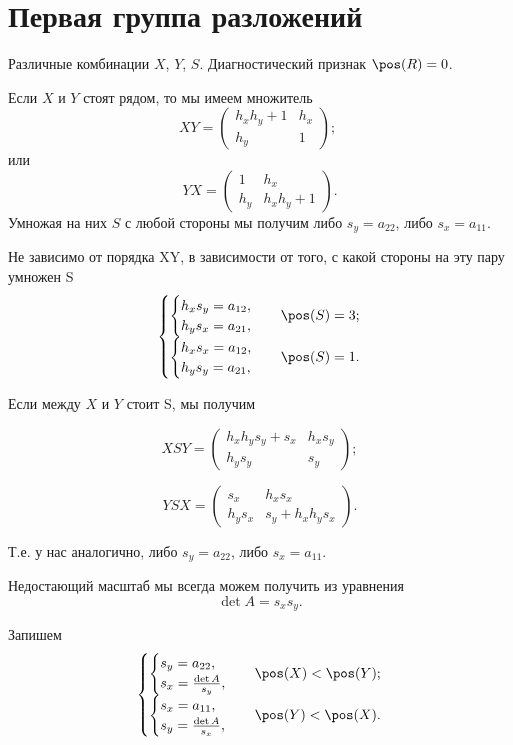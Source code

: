 \section{Первая группа разложений}

Различные комбинации $X$, $Y$, $S$.
Диагностический признак $\pos(R)=0$.

Если $X$ и $Y$ стоят рядом, то мы имеем множитель
$$XY = \begin{pmatrix}
	h_xh_y+1 & h_x \\
	h_y & 1
\end{pmatrix};\;
$$
или
$$
YX = \begin{pmatrix}
	1 & h_x \\
	h_y & h_xh_y+1
\end{pmatrix}.$$
Умножая на них $S$ с любой стороны мы получим либо $s_y = a_{22}$, либо $s_x = a_{11}$.

Не зависимо от порядка XY, в зависимости от того, с какой стороны на эту пару умножен S
$$\begin{cases}
	\begin{cases}
		h_xs_y = a_{12},\\
		h_ys_x = a_{21},
	\end{cases}
	& \pos(S)=3;\\
	\begin{cases}
		h_xs_x = a_{12},\\
		h_ys_y = a_{21},
	\end{cases}
	& \pos(S)=1.
\end{cases}
$$


Если между $X$ и $Y$ стоит S, мы получим

$$XSY =
\begin{pmatrix}
	h_x h_y s_y + s_x & h_x s_y \\
	h_y s_y  & s_y
\end{pmatrix};
$$

$$YSX =
\begin{pmatrix}
s_x & h_x s_x\\
h_y s_x & s_y + h_x h_y s_x
\end{pmatrix}.
$$

Т.е. у нас аналогично, либо $s_y = a_{22}$, либо $s_x = a_{11}$.

Недостающий масштаб мы всегда можем получить из уравнения
$$\det A = s_x s_y.$$

Запишем
$$\begin{cases}
	\begin{cases}
		s_y = a_{22},\\
		s_x = \frac{\det{A}}{s_y},\\
	\end{cases} & \pos(X)<\pos(Y);\\
	\begin{cases}
		s_x = a_{11},\\
		s_y = \frac{\det{A}}{s_x},\\
	\end{cases} & \pos(Y)<\pos(X).
\end{cases}$$


